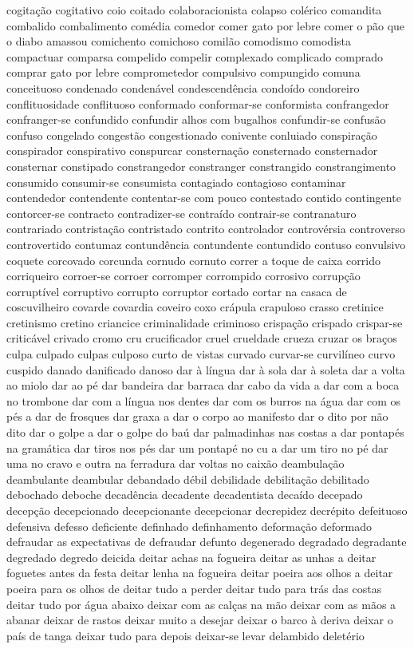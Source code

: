 \documentclass[ruledheader]{abnt_UFF}
\begin{document}
cogita\c{c}\~ao cogitativo coio coitado colaboracionista colapso col\'{e}rico comandita combalido combalimento com\'{e}dia comedor comer gato por lebre comer o p\~ao que o diabo amassou comichento comichoso comil\~ao comodismo comodista compactuar comparsa compelido compelir complexado complicado comprado comprar gato por lebre comprometedor compulsivo compungido comuna conceituoso condenado conden\'{a}vel condescend\^{e}ncia condo\'{i}do condoreiro conflituosidade conflituoso conformado conformar-se conformista confrangedor confranger-se confundido confundir alhos com bugalhos confundir-se confus\~ao confuso congelado congest\~ao congestionado conivente conluiado conspira\c{c}\~ao conspirador conspirativo conspurcar consterna\c{c}\~ao consternado consternador consternar constipado constrangedor constranger constrangido constrangimento consumido consumir-se consumista contagiado contagioso contaminar contendedor contendente contentar-se com pouco contestado contido contingente contorcer-se contracto contradizer-se contra\'{i}do contrair-se contranaturo contrariado contrista\c{c}\~ao contristado contrito controlador controv\'{e}rsia controverso controvertido contumaz contund\^{e}ncia contundente contundido contuso convulsivo coquete corcovado corcunda cornudo cornuto correr a toque de caixa corrido corriqueiro corroer-se corroer corromper corrompido corrosivo corrup\c{c}\~ao corrupt\'{i}vel corruptivo corrupto corruptor cortado cortar na casaca de coscuvilheiro covarde covardia coveiro coxo cr\'{a}pula crapuloso crasso cretinice cretinismo cretino criancice criminalidade criminoso crispa\c{c}\~ao crispado crispar-se critic\'{a}vel crivado cromo cru crucificador cruel crueldade crueza cruzar os bra\c{c}os culpa culpado culpas culposo curto de vistas curvado curvar-se curvil\'{i}neo curvo cuspido danado danificado danoso dar \`{a} l\'{i}ngua dar \`{a} sola dar \`{a} soleta dar a volta ao miolo dar ao p\'{e} dar bandeira dar barraca dar cabo da vida a dar com a boca no trombone dar com a l\'{i}ngua nos dentes dar com os burros na \'{a}gua dar com os p\'{e}s a dar de frosques dar graxa a dar o corpo ao manifesto dar o dito por n\~ao dito dar o golpe a dar o golpe do ba\'{u} dar palmadinhas nas costas a dar pontap\'{e}s na gram\'{a}tica dar tiros nos p\'{e}s dar um pontap\'{e} no cu a dar um tiro no p\'{e} dar uma no cravo e outra na ferradura dar voltas no caix\~ao deambula\c{c}\~ao deambulante deambular debandado d\'{e}bil debilidade debilita\c{c}\~ao debilitado debochado deboche decad\^{e}ncia decadente decadentista deca\'{i}do decepado decep\c{c}\~ao decepcionado decepcionante decepcionar decrepidez decr\'{e}pito defeituoso defensiva defesso deficiente definhado definhamento deforma\c{c}\~ao deformado defraudar as expectativas de defraudar defunto degenerado degradado degradante degredado degredo deicida deitar achas na fogueira deitar as unhas a deitar foguetes antes da festa deitar lenha na fogueira deitar poeira aos olhos a deitar poeira para os olhos de deitar tudo a perder deitar tudo para tr\'{a}s das costas deitar tudo por \'{a}gua abaixo deixar com as cal\c{c}as na m\~ao deixar com as m\~aos a abanar deixar de rastos deixar muito a desejar deixar o barco \`{a} deriva deixar o pa\'{i}s de tanga deixar tudo para depois deixar-se levar delambido delet\'{e}rio 
\end{document}
